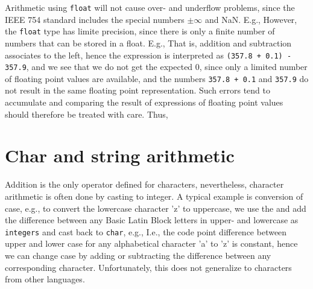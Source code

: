 Arithmetic using \lstinline|float| will not cause over- and underflow problems, since the IEEE 754 standard includes the special numbers $\pm\infty$ and NaN. E.g.,
%
%
%
However, the \lstinline|float| type has limite precision, since there is only a finite number of numbers that can be stored in a float. E.g.,
%
%
%
That is, addition and subtraction associates to the left, hence the expression is interpreted as \lstinline!(357.8 + 0.1) - 357.9!, and we see that we do not get the expected 0, since only a limited number of floating point values are available, and the numbers \lstinline!357.8 + 0.1!  and \lstinline!357.9! do not result in the same floating point representation. Such errors tend to accumulate and comparing the result of expressions of floating point values should therefore be treated with care. Thus, 

\section{Char and string arithmetic}
Addition is the only operator defined for characters, nevertheless, character arithmetic is often done by casting to integer. A typical example is conversion of case, e.g., to convert the lowercase character 'z' to uppercase, we use the  and add the difference between any Basic Latin Block letters in upper- and lowercase as \lstinline{integers} and cast back to \lstinline{char}, e.g.,
%
%
I.e., the code point difference between upper and lower case for any alphabetical character 'a' to 'z' is constant, hence we can change case by adding or subtracting the difference between any corresponding character. Unfortunately, this does not generalize to characters from other languages.

